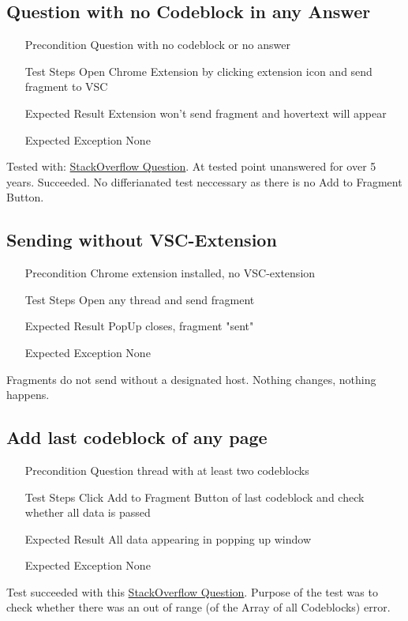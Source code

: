 \documentclass{report}
\begin{document}
\subsection*{Question with no Codeblock in any Answer}
\begin{itemize}
	\item[Precondition] Question with no codeblock or no answer
	\item[Test Steps] Open Chrome Extension by clicking extension icon and send fragment to VSC
	\item[Expected Result] Extension won't send fragment and hovertext will appear
	\item[Expected Exception] None
\end{itemize}
Tested with: \href{https://stackoverflow.com/questions/21446532/jboss-and-intellij-use-jboss-plugin-to-run-and-deploy-or-use-maven}{StackOverflow Question}.
At tested point unanswered for over 5 years. Succeeded. No differianated test neccessary as there is no Add to Fragment Button.

\subsection*{Sending without VSC-Extension}
\begin{itemize}
	\item[Precondition] Chrome extension installed, no VSC-extension
	\item[Test Steps] Open any thread and send fragment
	\item[Expected Result] PopUp closes, fragment "sent" 
	\item[Expected Exception] None
\end{itemize}
Fragments do not send without a designated host. Nothing changes, nothing happens.

\subsection*{Add last codeblock of any page}
\begin{itemize}
	\item[Precondition] Question thread with at least two codeblocks  
	\item[Test Steps] Click Add to Fragment Button of last codeblock and check whether all data is passed
	\item[Expected Result] All data appearing in popping up window
	\item[Expected Exception] None
\end{itemize}
Test succeeded with this \href{https://stackoverflow.com/questions/442404/retrieve-the-position-x-y-of-an-html-element}{StackOverflow Question}. 
Purpose of the test was to check whether there was an out of range (of the Array of all Codeblocks) error. 
\end{document}
